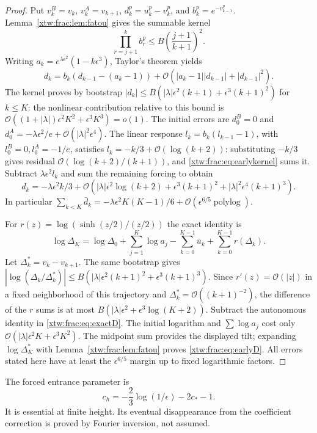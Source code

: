 \documentclass[11pt]{article}
\theoremstyle{remark}\newtheorem{remark}[theorem]{Remark}
\newcommand{\OO}{\mathcal O}
\begin{document}
\begin{proof}
Put $v_k^B=v_k$, $v_k^A=v_{k+1}$, $d_k^p=u_k^p-v_k^p$, and
$b_k^p=e^{-v_{k-1}^p}$. Lemma~\ref{xtw:frac:lem:fatou} gives the summable kernel
\begin{equation}\label{xtw:frac:eq:earlykernel}
 \prod_{r=j+1}^k b_r^p\le B\left(\frac{j+1}{k+1}\right)^2.
\end{equation}
Writing $a_k=e^{\lambda\epsilon^2}(1-k\epsilon^3)$, Taylor's theorem yields
\[
 d_k=b_k(d_{k-1}-(a_k-1))
          +\OO(|a_k-1||d_{k-1}|+|d_{k-1}|^2).
\]
The kernel proves by bootstrap
$|d_k|\le B(|\lambda|\epsilon^2(k+1)+\epsilon^3(k+1)^2)$ for $k\le K$:
the nonlinear contribution relative to this bound is
$\OO((1+|\lambda|)\epsilon^2K^2+\epsilon^3K^3)=o(1)$.
The initial errors are $d_0^B=0$ and
$d_0^A=-\lambda\epsilon^2/e+\OO(|\lambda|^2\epsilon^4)$.
The linear response $l_k=b_k(l_{k-1}-1)$, with $l_0^B=0,l_0^A=-1/e$,
satisfies $l_k=-k/3+\OO(\log(k+2))$: substituting $-k/3$ gives residual
$\OO(\log(k+2)/(k+1))$, and \eqref{xtw:frac:eq:earlykernel} sums it.
Subtract $\lambda\epsilon^2l_k$ and sum the remaining forcing to obtain
\[
 d_k=-\lambda\epsilon^2k/3+
 \OO(|\lambda|\epsilon^2\log(k+2)+\epsilon^3(k+1)^2
                  +|\lambda|^2\epsilon^4(k+1)^3).
\]
In particular $\sum_{k<K}\bar d_k=-\lambda\epsilon^2K(K-1)/6+
\OO(\epsilon^{6/5}\operatorname{polylog})$.

For $r(z)=\log(\sinh(z/2)/(z/2))$ the exact identity is
\begin{equation}\label{xtw:frac:eq:exactD}
 \log\Delta_K=\log\Delta_0+\sum_{j=1}^K\log a_j
                   -\sum_{k=0}^{K-1}\bar u_k+\sum_{k=0}^{K-1}r(\Delta_k).
\end{equation}
Let $\Delta_k^*=v_k-v_{k+1}$. The same bootstrap gives
$|\log(\Delta_k/\Delta_k^*)|\le
 B(|\lambda|\epsilon^2(k+1)^2+\epsilon^3(k+1)^3)$.
Since $r'(z)=\OO(|z|)$ in a fixed neighborhood of this trajectory and
$\Delta_k^*=\OO((k+1)^{-2})$, the difference of the $r$ sums is at most
$B(|\lambda|\epsilon^2+\epsilon^3\log(K+2))$.
Subtract the autonomous identity in \eqref{xtw:frac:eq:exactD}. The initial
logarithm and $\sum\log a_j$ cost only
$\OO(|\lambda|\epsilon^2K+\epsilon^3K^2)$.
The midpoint sum provides the displayed tilt; expanding
$\log\Delta_K^*$ with Lemma~\ref{xtw:frac:lem:fatou} proves \eqref{xtw:frac:eq:earlyD}.
All errors stated here have at least the $\epsilon^{6/5}$ margin up to
fixed logarithmic factors.
\end{proof}

The forced entrance parameter is
\begin{equation}\label{xtw:frac:eq:ch}
 c_h=-\frac23\log(1/\epsilon)-2c_*-1.
\end{equation}
It is essential at finite height. Its eventual disappearance from the
coefficient correction is proved by Fourier inversion, not assumed.
\end{document}
